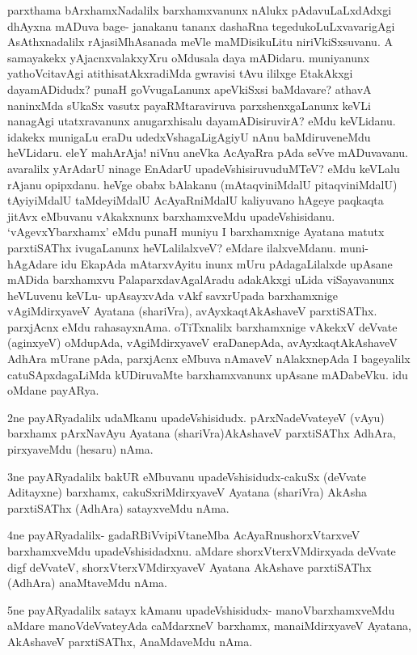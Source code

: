 \begin{artha}
parxthama bArxhamxNadalilx barxhamxvanunx nAlukx pAdavuLaLxdAdxgi dhAyxna mADuva bage- janakanu tananx dashaRna tegedukoLuLxvavarigAgi AsAthxnadalilx rAjasiMhAsanada meVle maMDisikuLitu niriVkiSxsuvanu. A samayakekx yAjacnxvalakxyXru oMdusala daya mADidaru. muniyanunx yathoVcitavAgi atithisatAkxradiMda gwravisi tAvu ililxge EtakAkxgi dayamADidudx? punaH goVvugaLanunx apeVkiSxsi baMdavare? athavA naninxMda sUkaSx vasutx payaRMtaraviruva parxshenxgaLanunx keVLi nanagAgi utatxravanunx anugarxhisalu dayamADisiruvirA? eMdu keVLidanu. idakekx munigaLu eraDu udedxVshagaLigAgiyU nAnu baMdiruveneMdu heVLidaru. eleY mahArAja! niVnu aneVka AcAyaRra pAda seVve mADuvavanu. avaralilx yArAdarU ninage EnAdarU upadeVshisiruvuduMTeV? eMdu keVLalu rAjanu opipxdanu. heVge obabx bAlakanu (mAtaqviniMdalU pitaqviniMdalU) tAyiyiMdalU taMdeyiMdalU AcAyaRniMdalU kaliyu\-vano hAgeye paqkaqta jitAvx eMbuvanu vAkakxnunx barxhamxveMdu upadeVshisidanu. `vAgevxYbarxhamx' eMdu punaH muniyu I barxhamxnige Ayatana matutx parxtiSAThx ivugaLanunx heVLalilalxveV? eMdare ilalxveMdanu. muni-hAgAdare idu EkapAda mAtarxvAyitu inunx mUru pAdagaLilalxde upAsane mADida barxhamxvu PalaparxdavAgalAradu adakAkxgi uLida viSayavanunx heVLuvenu keVLu- upAsayxvAda vAkf savxrUpada barxhamxnige vAgiMdirxyaveV Ayatana (shariVra), avAyxkaqtAkAshaveV parxtiSAThx. parxjAcnx eMdu rahasayxnAma. oTiTxnalilx barxhamxnige vAkekxV deVvate (aginxyeV) oMdupAda, vAgiMdirxyaveV eraDanepAda, avAyxkaqtAkAshaveV AdhAra mUrane pAda, parxjAcnx eMbuva nAmaveV nAlakxnepAda I bageyalilx catuSApxdagaLiMda kUDiruvaMte barxhamxvanunx upAsane mADabeVku. idu oMdane payARya. 
\end{artha}

\begin{artha}
2ne payARyadalilx udaMkanu upadeVshisidudx. pArxNa\break deVvateyeV (vAyu) barxhamx pArxNavAyu Ayatana (shariVra)\break AkAshaveV parxtiSAThx AdhAra, pirxyaveMdu (hesaru) nAma.
\end{artha}

\begin{artha}
3ne payARyadalilx bakUR eMbuvanu upadeVshisidudx-cakuSx (deVvate Aditayxne) barxhamx, cakuSxriMdirxyaveV Ayatana (shariVra) AkAsha parxtiSAThx (AdhAra) satayxveMdu nAma.
\end{artha}

\begin{artha}%
4ne payARyadalilx- gadaRBiVvipiVtaneMba AcAyaRnu\break shorxVtarxveV barxhamxveMdu upadeVshisidadxnu. aMdare shorxVterxVMdirxyada deVvate digf deVvateV, shorxVterxVMdirxyaveV Ayatana AkAshave parxtiSAThx (AdhAra) anaMtaveMdu nAma. 
\end{artha}
\newpage
\begin{artha}
5ne payARyadalilx satayx kAmanu upadeVshisidudx- manoVbarxhamxveMdu aMdare manoVdeVvateyAda caMdarxneV barxhamx, mana\break iMdirxyaveV Ayatana, AkAshaveV parxtiSAThx, AnaMdaveMdu nAma. 
\end{artha}


